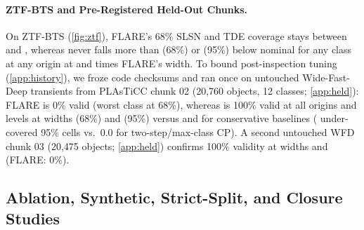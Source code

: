 \paragraph{ZTF-BTS and Pre-Registered Held-Out Chunks.}
On ZTF-BTS (\cref{fig:ztf}), FLARE's 68\% SLSN and TDE coverage stays between \ZTFflareSLSNmin{} and \ZTFflareSLSNmax{}, whereas \gamut{} never falls more than \ZTFgamutMaxUnderSixtyeight{} (68\%) or \ZTFgamutMaxUnderNinetyfive{} (95\%) below nominal for any class at any origin at \ZTFWidthRatioSixtyeight{} and \ZTFWidthRatioNinetyfive{} times FLARE's width.
To bound post-inspection tuning (\cref{app:history}), we froze code checksums and ran once on untouched Wide-Fast-Deep transients from PLAsTiCC chunk 02 (20,760 objects, 12 classes; \cref{app:held}): FLARE is 0\% valid (worst class \HeldWorstFlareSixtyeight{} at 68\%), whereas \gamut{} is 100\% valid at all origins and levels at widths \HeldWidthGamutSixtyeight{} (68\%) and \HeldWidthGamutNinetyfive{} (95\%) versus \HeldWidthValidSixtyeight{} and \HeldWidthValidNinetyfive{} for conservative baselines (\HeldCellsGamutNinetyfive{} under-covered 95\% cells vs.\ 0.0 for two-step/max-class CP).
A second untouched WFD chunk 03 (20,475 objects; \cref{app:held}) confirms 100\% validity at widths \HeldBWidthGamutSixtyeight{} and \HeldBWidthGamutNinetyfive{} (FLARE: 0\%).

\subsection{Ablation, Synthetic, Strict-Split, and Closure Studies}


